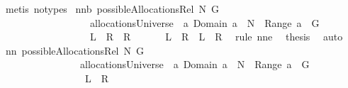 \begin{isabellebody}
\ {\isacharparenleft}metis\ {\isacharparenleft}no{\isacharunderscore}types{\isacharparenright}{\isacharparenright}%
\endisatagproof
{\isafoldproof}%
%
\isadelimproof
\isanewline
%
\endisadelimproof
\isanewline
{}\isamarkupfalse%
\ nn{}{}b{\isacharcolon}\ {\isachardoublequoteopen}possibleAllocationsRel\ N\ G\ {\isasymsubseteq}\ \isanewline
\ \ \ \ \ \ \ \ \ \ \ \ \ \ \ \ \ \ allocationsUniverse\ {\isasyminter}\ {\isacharbraceleft}a{\isachardot}\ {\isacharparenleft}Domain\ a{\isacharparenright}\ {\isasymsubseteq}\ N\ {\isacharampersand}\ {\isacharparenleft}{\isasymUnion}Range\ a{\isacharparenright}\ {\isacharequal}\ G{\isacharbraceright}{\isachardoublequoteclose}\isanewline
\ \ \ \ \ \ \ \ \ \ \ \ \ \ \ \ \ {\isacharparenleft}\ {\isachardoublequoteopen}{\isacharquery}L\ {\isasymsubseteq}\ {\isacharquery}R{}\ {\isasyminter}\ {\isacharquery}R{}{\isachardoublequoteclose}{\isacharparenright}\isanewline
%
\isadelimproof
%
\endisadelimproof
%
\isatagproof
{}\isamarkupfalse%
\ {\isacharminus}\ \isanewline
\ \ \isamarkupfalse%
\ {\isachardoublequoteopen}{\isacharquery}L\ {\isasymsubseteq}\ {\isacharquery}R{}\ {\isacharampersand}\ {\isacharquery}L\ {\isasymsubseteq}\ {\isacharquery}R{}{\isachardoublequoteclose}\ \isamarkupfalse%
\ {\isacharparenleft}rule\ nn{}{}e{\isacharparenright}\ \isamarkupfalse%
\ {\isacharquery}thesis\ \isamarkupfalse%
\ auto\ \isanewline
{}\isamarkupfalse%
%
\endisatagproof
{\isafoldproof}%
%
\isadelimproof
\isanewline
%
\endisadelimproof
\isanewline
{}\isamarkupfalse%
\ nn{}{}{\isacharcolon}\ {\isachardoublequoteopen}possibleAllocationsRel\ N\ G\ {\isacharequal}\ \isanewline
\ \ \ \ \ \ \ \ \ \ \ \ \ \ \ \ {\isacharparenleft}allocationsUniverse\ {\isasyminter}\ {\isacharbraceleft}a{\isachardot}\ {\isacharparenleft}Domain\ a{\isacharparenright}\ {\isasymsubseteq}\ N\ {\isacharampersand}\ {\isacharparenleft}{\isasymUnion}Range\ a{\isacharparenright}\ {\isacharequal}\ G{\isacharbraceright}{\isacharparenright}{\isachardoublequoteclose}\ \isanewline
\ \ \ \ \ \ \ \ \ \ \ \ \ \ \ \ {\isacharparenleft}\ {\isachardoublequoteopen}{\isacharquery}L\ {\isacharequal}\ {\isacharquery}R{\isachardoublequoteclose}{\isacharparenright}\ \isanewline
%
\isadelimproof
%
\endisadelimproof
%
\isatagproof
{}\isamarkupfalse%
\ {\isacharminus}\isanewline
\ \ \isamarkupfalse%

\end{isabellebody}
